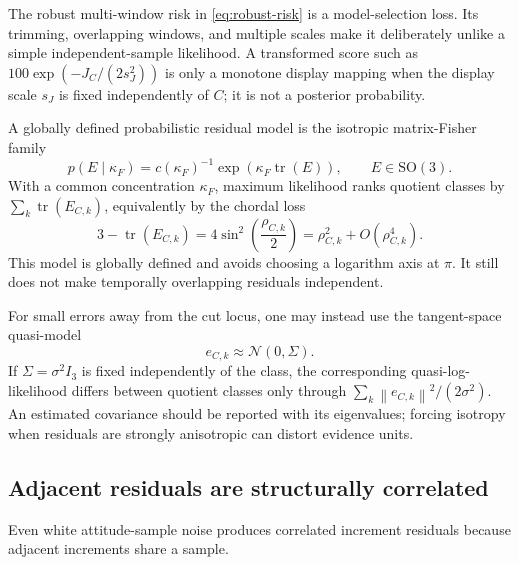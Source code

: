 \documentclass[11pt]{article}
\newcommand{\SO}{\mathrm{SO}(3)}
\newcommand{\I}{I_3}
\newcommand{\tr}{\operatorname{tr}}
\newcommand{\norm}[1]{\left\lVert #1 \right\rVert}
\begin{document}
    The robust multi-window risk in \eqref{eq:robust-risk} is a model-selection loss. Its
    trimming, overlapping windows, and multiple scales make it deliberately unlike a simple
    independent-sample likelihood. A transformed score such as
    $100\exp(-J_C/(2s_J^2))$ is only a monotone display mapping when the display scale
    $s_J$ is fixed independently of $C$; it is not a posterior probability.

    A globally defined probabilistic residual model is the isotropic matrix-Fisher family
    \cite{lee2018}
    \begin{equation}
        p(E\mid\kappa_F)
        =c(\kappa_F)^{-1}\exp\!\left(\kappa_F\tr(E)\right),
        \qquad E\in\SO.
    \end{equation}
    With a common concentration $\kappa_F$, maximum likelihood ranks quotient classes by
    $\sum_k\tr(E_{C,k})$, equivalently by the chordal loss
    \begin{equation}
        3-\tr(E_{C,k})
        =4\sin^2\!\left(\frac{\rho_{C,k}}{2}\right)
        =\rho_{C,k}^2+O(\rho_{C,k}^4).
    \end{equation}
    This model is globally defined and avoids choosing a logarithm axis at $\pi$. It still
    does not make temporally overlapping residuals independent.

    For small errors away from the cut locus, one may instead use the tangent-space
    quasi-model
    \begin{equation}
        e_{C,k}\approx\mathcal N(0,\Sigma).
    \end{equation}
    If $\Sigma=\sigma^2\I$ is fixed independently of the class, the corresponding
    quasi-log-likelihood differs between quotient classes only through
    $\sum_k\norm{e_{C,k}}^2/(2\sigma^2)$. An estimated covariance should be reported with
    its eigenvalues; forcing isotropy when residuals are strongly anisotropic can distort
    evidence units.

    \subsection{Adjacent residuals are structurally correlated}

    Even white attitude-sample noise produces correlated increment residuals because
    adjacent increments share a sample.
\end{document}
